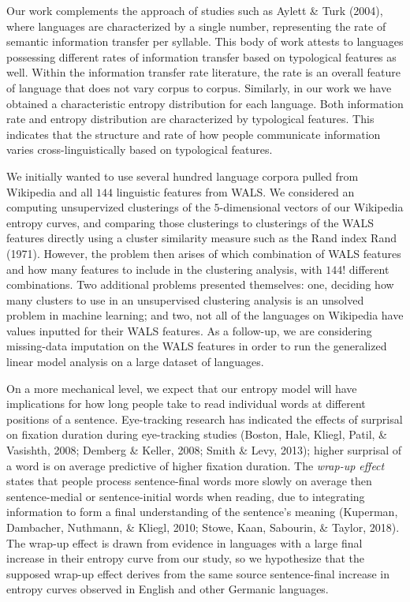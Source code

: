 \documentclass[10pt, letterpaper]{article}
\begin{document}
Our work complements the approach of studies such as Aylett \& Turk
(2004), where languages are characterized by a single number,
representing the rate of semantic information transfer per syllable.
This body of work attests to languages possessing different rates of
information transfer based on typological features as well. Within the
information transfer rate literature, the rate is an overall feature of
language that does not vary corpus to corpus. Similarly, in our work we
have obtained a characteristic entropy distribution for each language.
Both information rate and entropy distribution are characterized by
typological features. This indicates that the structure and rate of how
people communicate information varies cross-linguistically based on
typological features.

We initially wanted to use several hundred language corpora pulled from
Wikipedia and all \(144\) linguistic features from WALS. We considered
an computing unsupervized clusterings of the \(5\)-dimensional vectors
of our Wikipedia entropy curves, and comparing those clusterings to
clusterings of the WALS features directly using a cluster similarity
measure such as the Rand index Rand (1971). However, the problem then
arises of which combination of WALS features and how many features to
include in the clustering analysis, with \(144!\) different
combinations. Two additional problems presented themselves: one,
deciding how many clusters to use in an unsupervised clustering analysis
is an unsolved problem in machine learning; and two, not all of the
languages on Wikipedia have values inputted for their WALS features. As
a follow-up, we are considering missing-data imputation on the WALS
features in order to run the generalized linear model analysis on a
large dataset of languages.

On a more mechanical level, we expect that our entropy model will have
implications for how long people take to read individual words at
different positions of a sentence. Eye-tracking research has indicated
the effects of surprisal on fixation duration during eye-tracking
studies (Boston, Hale, Kliegl, Patil, \& Vasishth, 2008; Demberg \&
Keller, 2008; Smith \& Levy, 2013); higher surprisal of a word is on
average predictive of higher fixation duration. The \emph{wrap-up
effect} states that people process sentence-final words more slowly on
average then sentence-medial or sentence-initial words when reading, due
to integrating information to form a final understanding of the
sentence's meaning (Kuperman, Dambacher, Nuthmann, \& Kliegl, 2010;
Stowe, Kaan, Sabourin, \& Taylor, 2018). The wrap-up effect is drawn
from evidence in languages with a large final increase in their entropy
curve from our study, so we hypothesize that the supposed wrap-up effect
derives from the same source sentence-final increase in entropy curves
observed in English and other Germanic languages.
\end{document}
